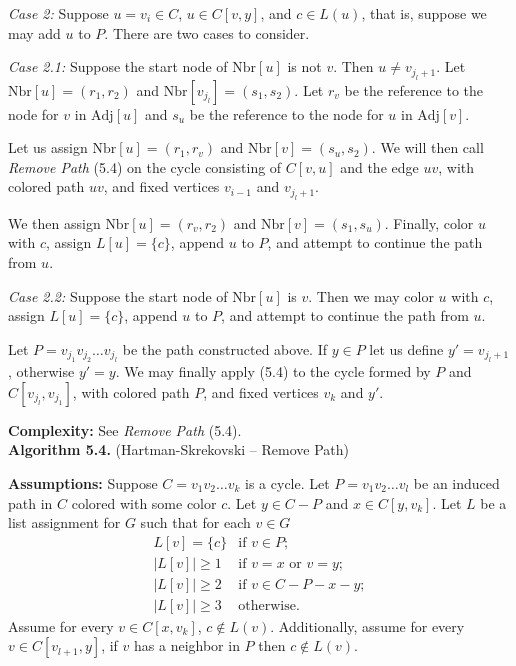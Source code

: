 \documentclass[letterpaper, 12pt]{article}
\theoremstyle{definition}
\theoremstyle{definition}
\theoremstyle{thm}
\theoremstyle{definition}
\begin{document}
\textit{Case 2:} Suppose $u=v_i\in C$,
$u\in C[v,y]$, and $c\in L(u)$, that is, suppose we may add $u$ to $P$.
There are two cases to consider.

\textit{Case 2.1:} Suppose the start node of $\text{Nbr}[u]$ is not $v$. Then
$u\ne v_{j_l +1}$. Let $\text{Nbr}[u]=(r_1,r_2)$ and
$\text{Nbr}[v_{j_l}]=(s_1,s_2)$. Let $r_v$ be the reference to the node for
$v$ in $\text{Adj}[u]$ and $s_u$ be the reference to the node for $u$ in
$\text{Adj}[v]$.

Let us assign $\text{Nbr}[u]=(r_1,r_v)$ and $\text{Nbr}[v]=(s_u,s_2)$. We will
then call \textit{Remove Path} (5.4) on the cycle consisting of $C[v,u]$ and the
edge $uv$, with colored path $uv$, and fixed vertices $v_{i-1}$ and
$v_{j_l+1}$.

We then assign $\text{Nbr}[u]=(r_v,r_2)$ and $\text{Nbr}[v]=(s_1,s_u)$. Finally,
color $u$ with $c$, assign $L[u]=\{c\}$, append $u$ to $P$, and attempt to
continue the path from $u$.

\textit{Case 2.2:} Suppose the start node of $\text{Nbr}[u]$ is $v$. Then we may
color $u$ with $c$, assign $L[u]=\{c\}$, append $u$ to $P$, and attempt to
continue the path from $u$.

Let $P=v_{j_1}v_{j_2}\ldots v_{j_l}$ be the path constructed above.
If $y\in P$ let us define $y'=v_{j_l+1}$, otherwise $y'=y$.
We may finally apply  (5.4) to the cycle formed by $P$ and
$C[v_{j_l},v_{j_1}]$, with colored path $P$, and fixed
vertices $v_k$ and $y'$.

\noindent\textbf{Complexity:} See \textit{Remove Path} (5.4).\\

\noindent\textbf{Algorithm 5.4.} (Hartman-Skrekovski -- Remove Path)

\noindent\textbf{Assumptions:} Suppose $C=v_1v_2\ldots v_k$ is a cycle. Let
$P=v_1v_2\ldots v_l$ be an induced path in $C$ colored with some color $c$. Let
$y\in C-P$ and $x\in C[y,v_k]$. Let $L$ be a list assignment for $G$ such that
for each $v\in G$
\[
    \begin{array}{ll}
        L[v]=\{c\} & \text{if } v\in P;\\
	    |L[v]|\ge 1 & \text{if } v=x \text{ or } v=y;\\
	    |L[v]|\ge 2 & \text{if } v\in C-P-x-y;\\
	    |L[v]|\ge 3 & \text{otherwise.}
    \end{array}
\]
Assume for every $v\in C[x,v_k]$, $c\not\in L(v)$. Additionally, assume for
every $v\in C[v_{l+1},y]$, if $v$ has a neighbor in $P$ then $c\not\in L(v)$.
\end{document}
